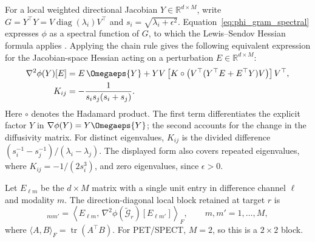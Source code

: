 For a local weighted directional Jacobian $Y\in\mathbb{R}^{d\times M}$, write $G=Y^\top Y=V\operatorname{diag}(\lambda_i)V^\top$ and $s_i=\sqrt{\lambda_i+\epsilon^2}$. Equation~\eqref{eq:phi_gram_spectral} expresses $\phi$ as a spectral function of $G$, to which the Lewis--Sendov Hessian formula applies \cite[Theorem~3.3]{doi:10.1137/S089547980036838X}. Applying the chain rule gives the following equivalent expression for the Jacobian-space Hessian acting on a perturbation $E\in\mathbb{R}^{d\times M}$:
\begin{equation}
    \begin{aligned}
    \nabla^2\phi(Y)[E]
    &=E\,\Omegaeps{Y}
    +YV\left[K\circ\left(V^\top(Y^\top E+E^\top Y)V\right)\right]V^\top,\\
    K_{ij}&=-\frac{1}{s_i s_j(s_i+s_j)}.
    \end{aligned}
    \label{eq:ls_local_hessian_action}
\end{equation}
Here $\circ$ denotes the Hadamard product. The first term differentiates the explicit factor $Y$ in $\nabla\phi(Y)=Y\Omegaeps{Y}$; the second accounts for the change in the diffusivity matrix. For distinct eigenvalues, $K_{ij}$ is the divided difference $(s_i^{-1}-s_j^{-1})/(\lambda_i-\lambda_j)$. The displayed form also covers repeated eigenvalues, where $K_{ij}=-1/(2s_i^3)$, and zero eigenvalues, since $\epsilon>0$.

Let $E_{\ell m}$ be the $d\times M$ matrix with a single unit entry in difference channel $\ell$ and modality $m$. The direction-diagonal local block retained at target $r$ is
\begin{equation}
    [\Theta_{r,\ell}]_{mm'}
    =\left\langle E_{\ell m},\,
    \nabla^2\phi(\tilde{\mathcal G}_r)[E_{\ell m'}]\right\rangle_F,
    \qquad m,m'=1,\ldots,M,
    \label{eq:ls_local_direction_block}
\end{equation}
where $\langle A,B\rangle_F=\operatorname{tr}(A^\top B)$. For PET/SPECT, $M=2$, so this is a $2\times2$ block.

